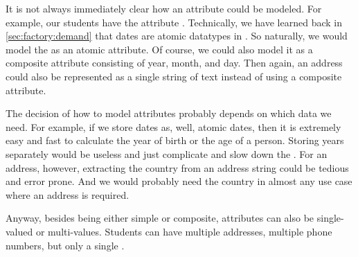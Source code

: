 It is not always immediately clear how an attribute could be modeled.
For example, our students have the attribute \emph{}.
Technically, we have learned back in \cref{sec:factory:demand} that dates are atomic datatypes in \sql.
So naturally, we would model the  as an atomic attribute.
Of course, we could also model it as a composite attribute consisting of year, month, and day.
Then again, an address could also be represented as a single string of text instead of using a composite attribute.

The decision of how to model attributes probably depends on which data we need.
For example, if we store dates as, well, atomic dates, then it is extremely easy and fast to calculate the year of birth or the age of a person.
Storing years separately would be useless and just complicate and slow down the \db.
For an address, however, extracting the country from an address string could be tedious and error prone.
And we would probably need the country in almost any use case where an address is required.

Anyway, besides being either simple or composite, attributes can also be single-valued or multi-values.
Students can have multiple addresses, multiple phone numbers, but only a single .%
\FloatBarrier%
\endhsection%
%
